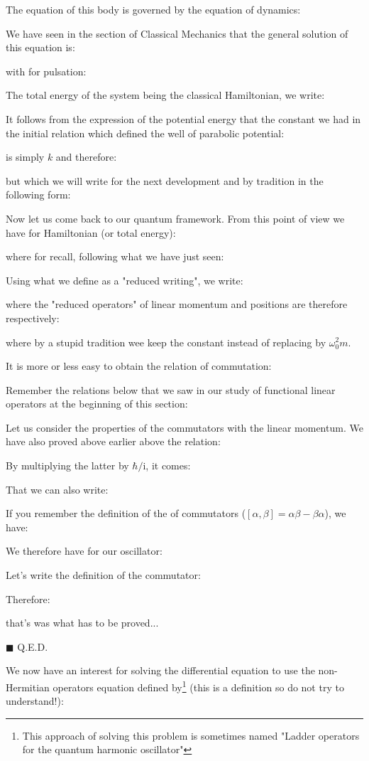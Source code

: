 	The equation of this body is governed by the equation of dynamics:
	
	We have seen in the section of Classical Mechanics that the general solution of this equation is:
	
	with for pulsation:
	
	The total energy of the system being the classical Hamiltonian, we write:
	
	It follows from the expression of the potential energy that the constant we had in the initial relation which defined the well of parabolic potential:
	
	is simply $k$ and therefore:
	
	but which we will write for the next development and by tradition in the following form:
	
	Now let us come back to our quantum framework. From this point of view we have for Hamiltonian (or total energy):
	
	where for recall, following what we have just seen:
	
	Using what we define as a "reduced writing", we write:
	
	where the "reduced operators" of linear momentum and positions are therefore respectively:
	
	where by a stupid tradition wee keep the constant instead of replacing by $\omega_0^2m$.
	
	It is more or less easy to obtain the relation of commutation:
	
	\begin{dem}
	Remember the relations below that we saw in our study of functional linear operators at the beginning of this section:
	
	Let us consider the properties of the commutators with the linear momentum. We have also proved above earlier above the relation:
	
	By multiplying the latter by $\hbar/\mathrm{i}$, it comes:
	
	That we can also write:
	
	If you remember the definition of the of commutators ($[\alpha,\beta]=\alpha\beta-\beta\alpha$), we have:
	
	We therefore have for our oscillator:
	
	Let's write the definition of the commutator:
	
	Therefore:
	
	that's was what has to be proved...
	\begin{flushright}
		$\blacksquare$  Q.E.D.
	\end{flushright}
	\end{dem}
	We now have an interest for solving the differential equation to use the non-Hermitian operators equation defined by\footnote{This approach of solving this problem is sometimes named "Ladder operators for the quantum harmonic oscillator"} (this is a definition so do not try to understand!):
	
